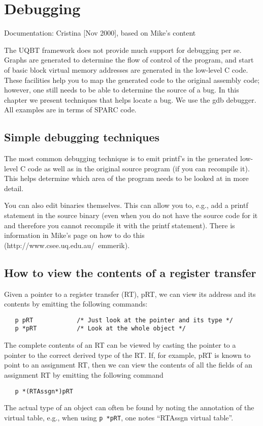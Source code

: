 
\chapter{Debugging}
\label{ch-debugging}

{\small
\begin{flushright}
Documentation: Cristina [Nov 2000], based on Mike's content
\end{flushright}
}


The UQBT framework does not provide much support for debugging per se.  
Graphs are generated to determine the flow of control of the program, 
and start of basic block virtual memory addresses are generated in the 
low-level C code.  
These facilities help you to map the generated code to the original 
assembly code; however, one still needs to be able to determine 
the source of a bug.
In this chapter we present techniques that helps locate a bug. 
We use the gdb debugger.  All examples are in terms of SPARC code. 


\section{Simple debugging techniques}
The most common debugging technique is to emit printf's in the 
generated low-level C code as well as in the original source program 
(if you can recompile it).  This helps determine which area of the 
program needs to be looked at in more detail.  

You can also edit binaries themselves.  This can allow you to, e.g., 
add a printf statement in the source binary (even when you do not
have the source code for it and therefore you cannot recompile it
with the printf statement).   
There is information in Mike's page on how to do this 
(http://www.csee.uq.edu.au/~emmerik).


\section{How to view the contents of a register transfer}
Given a pointer to a register transfer (RT), pRT, we can view its address 
and its contents by emitting the following commands: 
\begin{verbatim}
   p pRT            /* Just look at the pointer and its type */
   p *pRT           /* Look at the whole object */ 
\end{verbatim}
The complete contents of an RT can be viewed by casting the pointer 
to a pointer to the correct derived type of the RT.  If, for example, 
pRT is known to point to an assignment RT, then we can view the contents 
of all the fields of an assignment RT by emitting the following command
\begin{verbatim}
   p *(RTAssgn*)pRT
\end{verbatim}
The actual type of an object can often be found by noting the annotation 
of the virtual table, e.g., when using \verb!p *pRT!, one notes 
``RTAssgn virtual table''. 

